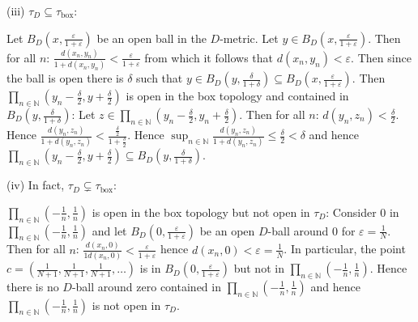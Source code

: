 \documentclass{article}
\begin{document}
(iii) $\tau_D \subseteq \tau_{\text{box}}$:
\vspace{0.5cm}

Let $B_D(x, \frac{\varepsilon}{1 + \varepsilon})$ be an open ball in the $D$-metric. Let $y \in B_D (x, \frac{\varepsilon}{1 + \varepsilon})$. Then for all $n$: $\frac{d(x_n,y_n)}{1+d(x_n,y_n)} < \frac{\varepsilon}{1+\varepsilon}$ from which it follows that $d(x_n,y_n) < \varepsilon$. Then since the ball is open there is $\delta $ such that $y \in B_D(y, \frac{\delta}{1+\delta}) \subseteq B_D(x,\frac{\varepsilon}{1+\varepsilon})$. Then $\prod_{n \in \mathbb N} (y_n - \frac{\delta}{2}, y + \frac{\delta}{2})$ is open in the box topology and contained in $B_D(y, \frac{\delta}{1+\delta})$: Let $z \in \prod_{n \in \mathbb N} (y_n - \frac{\delta}{2}, y_n + \frac{\delta}{2})$. Then for all $n$: $d(y_n, z_n) < \frac{\delta}{2}$. Hence $\frac{d(y_n, z_n)}{1+d(y_n,z_n)} < \frac{\frac{\delta}{2}}{1 + \frac{\delta}{2}}$. Hence $\sup_{n \in \mathbb N} \frac{d(y_n, z_n)}{1 + d(y_n , z_n)} \le \frac{\delta}{2} < \delta$ and hence $\prod_{n \in \mathbb N} (y_n - \frac{\delta}{2}, y + \frac{\delta}{2}) \subseteq B_D(y, \frac{\delta}{1+\delta})$.
\vspace{0.5cm}


(iv) In fact, $\tau_D \subsetneq \tau_{\text{box}}$:
\vspace{0.5cm}

$\prod_{n \in \mathbb N} (-\frac{1}{n}, \frac{1}{n})$ is open in the box topology but not open in $\tau_D$: Consider $0$ in $\prod_{n \in \mathbb N} (-\frac{1}{n}, \frac{1}{n})$ and let $B_D (0, \frac{\varepsilon}{1+\varepsilon})$ be an open $D$-ball around $0$ for $\varepsilon = \frac{1}{N}$. Then for all $n$: $\frac{d(x_n,0)}{1 d(x_n,0)} < \frac{\varepsilon}{1 + \varepsilon}$ hence  $d(x_n,0) < \varepsilon = \frac{1}{N}$. In particular, the point $c = (\frac{1}{N+1}, \frac{1}{N+1}, \frac{1}{N+1}, \dots )$ is in $B_D(0, \frac{\varepsilon}{1+ \varepsilon})$ but not in $\prod_{n \in \mathbb N} (-\frac{1}{n}, \frac{1}{n})$. Hence there is no $D$-ball around zero contained in $\prod_{n \in \mathbb N} (-\frac{1}{n}, \frac{1}{n})$ and hence $\prod_{n \in \mathbb N} (-\frac{1}{n}, \frac{1}{n})$ is not open in $\tau_D$.
\end{document}
